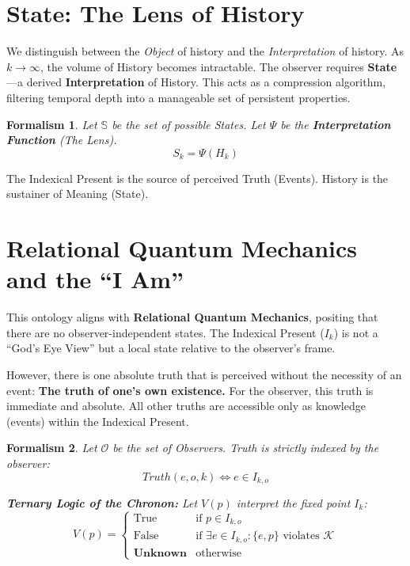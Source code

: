 \documentclass[12pt, a4paper]{article}
\newtheorem{formalism}{Formalism}
\begin{document}
\section{State: The Lens of History}

We distinguish between the \textit{Object} of history and the \textit{Interpretation} of history. As $k \to \infty$, the volume of History becomes intractable. The observer requires \textbf{State}—a derived \textbf{Interpretation} of History. This acts as a compression algorithm, filtering temporal depth into a manageable set of persistent properties.

\begin{formalism}
Let $\mathbb{S}$ be the set of possible States.
Let $\Psi$ be the \textbf{Interpretation Function} (The Lens).
$$S_k = \Psi(H_k)$$
\end{formalism}

The Indexical Present is the source of perceived Truth (Events). History is the sustainer of Meaning (State).

\section{Relational Quantum Mechanics and the ``I Am''}

This ontology aligns with \textbf{Relational Quantum Mechanics}, positing that there are no observer-independent states. The Indexical Present ($I_k$) is not a ``God's Eye View'' but a local state relative to the observer's frame.

However, there is one absolute truth that is perceived without the necessity of an event: \textbf{The truth of one’s own existence.} For the observer, this truth is immediate and absolute. All other truths are accessible only as knowledge (events) within the Indexical Present.

\begin{formalism}
Let $\mathcal{O}$ be the set of Observers. Truth is strictly indexed by the observer:
$$Truth(e, o, k) \iff e \in I_{k, o}$$

\textbf{Ternary Logic of the Chronon:}
Let $V(p)$ interpret the fixed point $I_k$:
$$V(p) = \begin{cases} \text{True} & \text{if } p \in I_{k, o} \\ \text{False} & \text{if } \exists e \in I_{k, o} : \{e, p\} \text{ violates } \mathcal{K} \\ \textbf{Unknown} & \text{otherwise} \end{cases}$$
\end{formalism}
\end{document}
